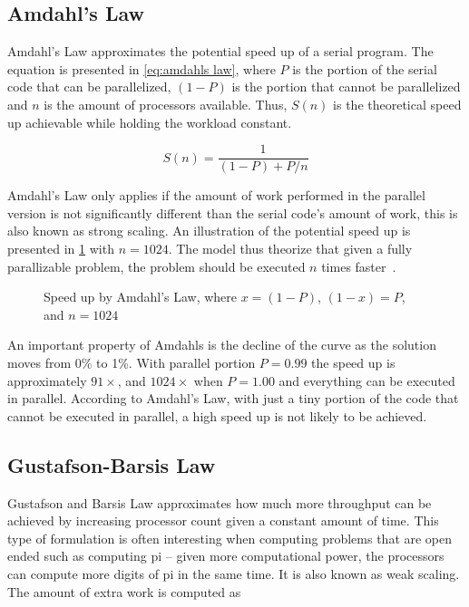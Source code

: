 \subsection{Amdahl's Law}
\label{sec:amdahls law}

Amdahl's Law approximates the potential speed up of a serial program.
The equation is presented in \cref{eq:amdahls law}, where $P$ is the portion of the serial code that can be parallelized, $(1-P)$ is the portion that cannot be parallelized and $n$ is the amount of processors available.
Thus, $S(n)$ is the theoretical speed up achievable while holding the workload constant.

\begin{equation}
  \label{eq:amdahls law}
  S(n) = \frac{1}{(1-P) + P/n}
\end{equation}

Amdahl's Law only applies if the amount of work performed in the parallel version is not significantly different than the serial code's amount of work, this is also known as strong scaling.
An illustration of the potential speed up is presented in \cref{fig:amdahls law} with $n=1024$.
The model thus theorize that given a fully parallizable problem, the problem should be executed $n$ times faster~\cite{farber2011cuda}.

\begin{figure}[htb]
  \centering
  
  \caption{Speed up by Amdahl's Law, where $x=(1-P)$, $(1-x)=P$, and $n=1024$}
  \label{fig:amdahls law}
\end{figure}

An important property of Amdahls is the decline of the curve as the solution moves from 0\% to 1\%.
With parallel portion $P=0.99$ the speed up is approximately $91\times$, and $1024\times$ when $P=1.00$ and everything can be executed in parallel.
According to Amdahl's Law, with just a tiny portion of the code that cannot be executed in parallel, a high speed up is not likely to be achieved.

\subsection{Gustafson-Barsis Law}
\label{sec:gustafson-barsis law}

Gustafson and Barsis Law approximates how much more throughput can be achieved by increasing processor count given a constant amount of time.
This type of formulation is often interesting when computing problems that are open ended such as computing pi -- given more computational power, the processors can compute more digits of pi in the same time.
It is also known as weak scaling.
The amount of extra work is computed as~\cite{amdahlorgustafson2011}

